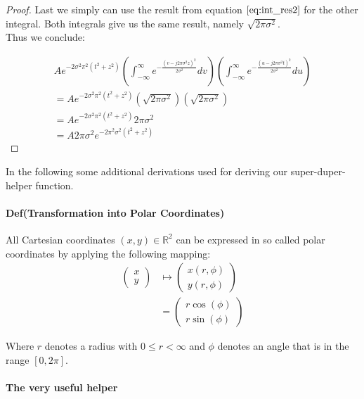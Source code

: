 \documentclass{paper}
\begin{document}
\begin{proof}
Last we simply can use the result from equation $\ref{eq:int_res2}$ for the other integral. Both integrals give us the same result, namely $\sqrt{2\pi \sigma^2}$. \\

Thus we conclude:

\begin{align}
A e^{- 2\sigma^2 \pi^2 (t^2 + z^2)} \left(\int_{-\infty}^{\infty} e^{-\frac{(v - j 2 \pi \sigma^2 z)^2}{2 \sigma^2}} dv \right) \left( \int_{-\infty}^{\infty} e^{-\frac{(u - j 2 \pi \sigma^2 t)^2}{2 \sigma^2}} du \right) \\
=
A e^{- 2\sigma^2 \pi^2 (t^2 + z^2)} (\sqrt{2\pi \sigma^2}) (\sqrt{2\pi \sigma^2}) \\
= 
A e^{- 2\sigma^2 \pi^2 (t^2 + z^2)} 2\pi \sigma^2 \\
=
A 2\pi \sigma^2 e^{- 2\pi^2 \sigma^2  (t^2 + z^2)} 
\label{eq:proof_done}
\end{align}

\end{proof}

In the following some additional derivations used for deriving our super-duper-helper function.

\paragraph{Def(Transformation into Polar Coordinates)} All Cartesian coordinates $(x,y) \in \mathbb{R}^2$ can be expressed in so called polar coordinates by applying the following mapping:
\begin{align}
\begin{pmatrix}x\\y\end{pmatrix} 
    &\mapsto \begin{pmatrix}x(r,\phi)\\y(r, \phi)\end{pmatrix} \\
    &= \begin{pmatrix}r \cos(\phi)\\r \sin(\phi)\end{pmatrix}
\label{eq:polar_coordinates}
\end{align}

Where $r$ denotes a radius with $0 \leq r < \infty$ and $\phi$ denotes an angle that is in the range $[0,2\pi]$.

\paragraph{The very useful helper}
\end{document}
